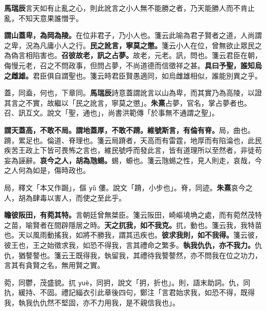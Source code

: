 \begin{quoting}\textbf{馬瑞辰}言天如有止亂之心，則此訛言之小人無不能勝之者，乃天能勝人而不肯止亂，不知天意果誰憎乎。\end{quoting}

\textbf{謂山蓋卑，為岡為陵。}{\footnotesize 在位非君子，乃小人也。箋云此喻為君子賢者之道，人尚謂之卑，況為凡庸小人之行。}\textbf{民之訛言，寧莫之懲。}{\footnotesize 箋云小人在位，曾無欲止眾民之為偽言相陷害也。}\textbf{召彼故老，訊之占夢。}{\footnotesize 故老，元老。訊，問也。箋云君臣在朝，侮慢元老，召之不問政事，但問占夢，不尚道德而信徵祥之甚。}\textbf{具曰予聖，誰知烏之雌雄。}{\footnotesize 君臣俱自謂聖也。箋云時君臣賢愚適同，如烏雌雄相似，誰能別異之乎。}

\begin{quoting}蓋，同盍，何也，下章同。\textbf{馬瑞辰}詩意蓋謂訛言以山為卑，而其實乃為高陵，以證其言之不實，故繼以「民之訛言，寧莫之懲」。\textbf{朱熹}占夢，官名，掌占夢者也。召、訊互文。說文「聖，通也」，尚書洪範傳「於事無不通謂之聖」。\end{quoting}

\textbf{謂天蓋高，不敢不局。謂地蓋厚，不敢不蹐。維號斯言，有倫有脊。}{\footnotesize 局，曲也。蹐，累足也。倫道、脊理也。箋云局蹐者，天高而有雷霆，地厚而有陷淪也，此民疾苦王政上下皆可畏怖之言也，維民號呼而發此言，皆有道理所以至然者，非徒苟妄為誣辭。}\textbf{哀今之人，胡為虺蜴。}{\footnotesize 蜴，螈也。箋云虺蜴之性，見人則走，哀哉，今之人何為如是，傷時政也。}

\begin{quoting}局，釋文「本又作跼」，傴 \texttt{yǔ} 僂。說文「蹐，小步也」。脊，同迹。\textbf{朱熹}哀今之人，胡為肆毒以害人，而使之至此乎。\end{quoting}

\textbf{瞻彼阪田，有菀其特。}{\footnotesize 言朝廷曾無桀臣。箋云阪田，崎嶇墝埆之處，而有菀然茂特之苗，喻賢者在間辟隱居之時。}\textbf{天之扤我，如不我克。}{\footnotesize 扤，動也。箋云我，我特苗也。天以風雨動搖我，如將不勝我，謂其迅疾也。}\textbf{彼求我則，如不我得。}{\footnotesize 箋云彼，彼王也，王之始徵求我，如恐不得我，言其禮命之繁多。}\textbf{執我仇仇，亦不我力。}{\footnotesize 仇仇，猶謷謷也。箋云王既得我，執留我，其禮待我謷謷然，亦不問我在位之功力，言其有貪賢之名，無用賢之實。}

\begin{quoting}菀，同鬱，茂盛貌。扤 \texttt{yuè}，同抈，說文「抈，折也」。則，語末助詞。仇，同扏，緩持、不固。禮記緇衣引此章後四句，鄭注「言君始求我，如恐不得，既得我，執我仇仇然不堅固，亦不力用我，是不親信我也」。\end{quoting}

